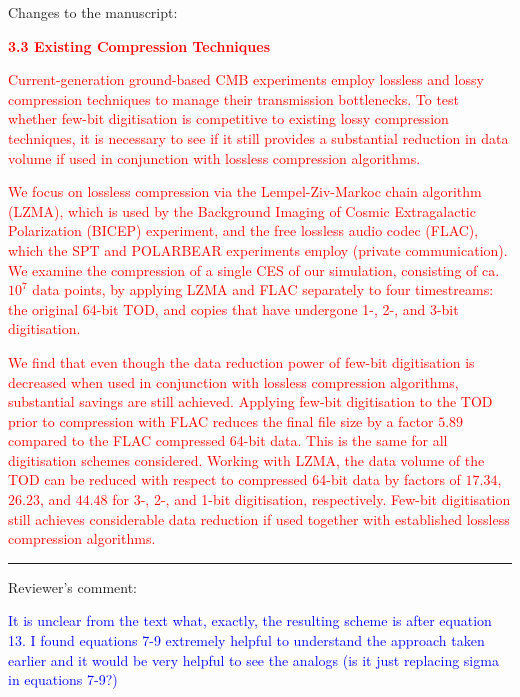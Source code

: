 \documentclass{article}
\newcommand{\changed}[1]{\textcolor{Red}{#1}}
\newcommand{\question}[1]{\textcolor{Blue}{#1}}
\newlength\tindent
\renewcommand{\indent}{\hspace*{\tindent}}
\begin{document}
\vspace{0.25cm}

Changes to the manuscript:

\indent \textbf{\changed{3.3 Existing Compression Techniques}}

\changed{Current-generation ground-based CMB experiments employ lossless and lossy compression techniques to manage their transmission bottlenecks. To test whether few-bit digitisation is competitive to existing lossy compression techniques, it is necessary to see if it still provides a substantial reduction in data volume if used in conjunction with lossless compression algorithms.}

\changed{We focus on lossless compression via the Lempel-Ziv-Markoc chain algorithm (LZMA), which is used by the Background Imaging of Cosmic Extragalactic Polarization (BICEP) experiment, and the free lossless audio codec (FLAC), which the SPT and POLARBEAR experiments employ (private communication). We examine the compression of a single CES of our simulation, consisting of ca. $10^7$ data points, by applying LZMA and FLAC separately to four timestreams: the original 64-bit TOD, and copies that have undergone 1-, 2-, and 3-bit digitisation.}

\changed{We find that even though the data reduction power of few-bit digitisation is decreased when used in conjunction with lossless compression algorithms, substantial savings are still achieved. Applying few-bit digitisation to the TOD prior to compression with FLAC reduces the final file size by a factor $5.89$ compared to the FLAC compressed 64-bit data. This is the same for all digitisation schemes considered. Working with LZMA, the data volume of the TOD can be reduced with respect to compressed 64-bit data by factors of $17.34$, $26.23$, and $44.48$ for 3-, 2-, and 1-bit digitisation, respectively. Few-bit digitisation still achieves considerable data reduction if used together with established lossless compression algorithms.}

\vspace{0.5cm}

\hrule

\vspace{0.5cm}

Reviewer's comment:

\indent \question{It is unclear from the text what, exactly, the resulting scheme is after equation 13. I found equations 7-9 extremely helpful to understand the approach taken earlier and it would be very helpful to see the analogs (is it just replacing sigma in equations 7-9?)}
\end{document}
